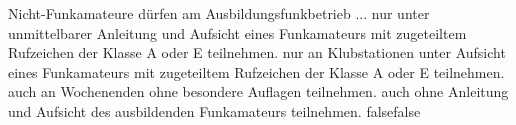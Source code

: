     {Nicht-Funkamateure dürfen am Ausbildungsfunkbetrieb ...}
    {nur unter unmittelbarer Anleitung und Aufsicht eines Funkamateurs mit zugeteiltem Rufzeichen der Klasse A oder E teilnehmen.}
    {nur an Klubstationen unter Aufsicht eines Funkamateurs mit zugeteiltem Rufzeichen der Klasse A oder E teilnehmen.}
    {auch an Wochenenden ohne besondere Auflagen teilnehmen.}
    {auch ohne Anleitung und Aufsicht des ausbildenden Funkamateurs teilnehmen.}
    {false}{false}